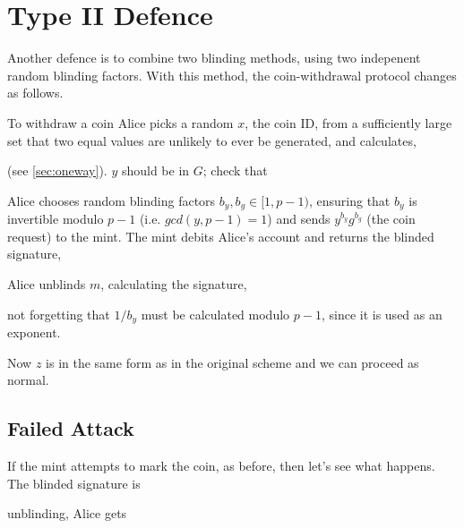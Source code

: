\documentclass[a4paper,titlepage]{article}
\begin{document}
\section{Type II Defence\cite{Anon1}}

Another defence is to combine two blinding methods, using two
indepenent random blinding factors. With this method, the
coin-withdrawal protocol changes as follows.

To withdraw a coin Alice picks a random $x$, the coin ID, from a
sufficiently large set that two equal values are unlikely to ever be
generated, and calculates,


(see \ref{sec:oneway}). $y$ should be in $G$; check that


Alice chooses random blinding factors $b_y,b_g \in [1,p-1)$, ensuring
that $b_y$ is invertible modulo $p-1$ (i.e. $gcd(y,p-1)=1$) and sends
$y^{b_y} g^{b_g}$ (the coin request) to the mint. The mint debits
Alice's account and returns the blinded signature,


Alice unblinds $m$, calculating the signature,


not forgetting that $1/b_y$ must be calculated modulo $p-1$, since it is
used as an exponent.

Now $z$ is in the same form as in the original scheme and we can
proceed as normal.

\subsection{Failed Attack}

If the mint attempts to mark the coin, as before, then let's see what
happens. The blinded signature is


unblinding, Alice gets

\end{document}

